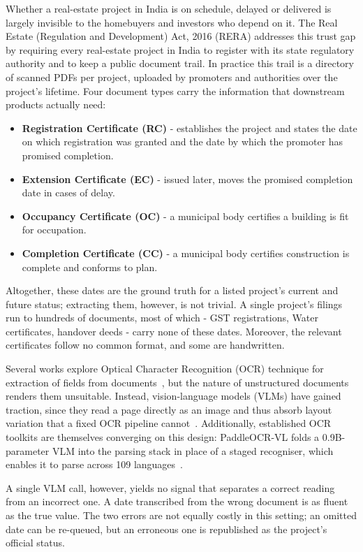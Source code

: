 \documentclass[letterpaper]{article} %
\begin{document}
Whether a real-estate project in India is on schedule, delayed or
delivered is largely invisible to the homebuyers and investors who
depend on it. The Real Estate (Regulation and Development) Act, 2016
(RERA) addresses this trust gap by requiring
every real-estate project in India to register with its state regulatory
authority and to keep a public document trail. In practice this trail is
a directory of scanned PDFs per project, uploaded by promoters and
authorities over the project's lifetime. Four document types carry the
information that downstream products actually need:
\begin{itemize}
  \item \textbf{Registration Certificate (RC)} - establishes the
        project and states the date on which registration was granted
        and the date by which the promoter has promised completion.
  \item \textbf{Extension Certificate (EC)} - issued later, moves the
        promised completion date in cases of delay.
  \item \textbf{Occupancy Certificate (OC)} - a municipal body
        certifies a building is fit for occupation.
  \item \textbf{Completion Certificate (CC)} - a municipal body
        certifies construction is complete and conforms to plan.
\end{itemize}

Altogether, these dates are the ground truth for a listed project's current and
future status; extracting them, however, is not trivial. A single project's filings 
run to hundreds of documents, most of which - GST registrations, Water certificates, 
handover deeds - carry none of these dates. Moreover, the relevant certificates follow 
no common format, and some are handwritten.

Several works explore Optical Character Recognition (OCR) technique for extraction of fields
from documents~\citep{zhang2024docparsing}, but the nature of unstructured documents renders them unsuitable. Instead,
vision-language models (VLMs) have gained traction, since they read a page directly as an
image and thus absorb layout variation that a fixed OCR pipeline cannot~\citep{han2025mdocagent}.
Additionally, established OCR toolkits are themselves converging on this design: PaddleOCR-VL
folds a 0.9B-parameter VLM into the parsing stack in place of a staged recogniser, which enables 
it to parse across 109 languages~\citep{cui2025paddleocrvl}.

A single VLM call, however, yields no signal that separates a correct reading from an
incorrect one. A date transcribed from the wrong document is as fluent as the true value.
The two errors are not equally costly in this setting; an omitted date can be
re-queued, but an erroneous one is republished as the project's official status.
\end{document}
